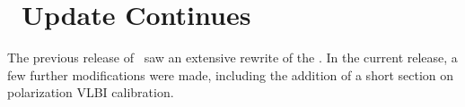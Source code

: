 \section{\Cookbook\ Update Continues}

The previous release of \AIPS\ saw an extensive rewrite of the
\Cookbook. In the current release, a few further modifications were
made, including the addition of a short section on polarization VLBI
calibration.
\vfill\eject
\centerline{\hss{}\hss}
\vfill

